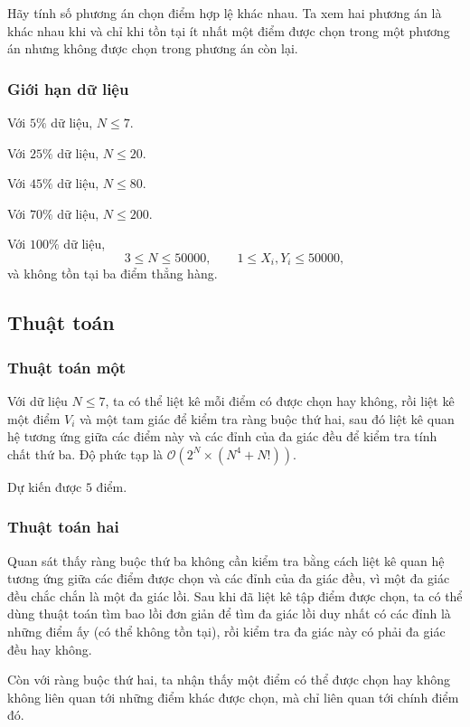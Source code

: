 \documentclass[11pt]{article}
\newcommand{\Oh}{\mathcal{O}}
\begin{document}
Hãy tính số phương án chọn điểm hợp lệ khác nhau. Ta xem hai phương án là khác
nhau khi và chỉ khi tồn tại ít nhất một điểm được chọn trong một phương án
nhưng không được chọn trong phương án còn lại.

\subsubsection{Giới hạn dữ liệu}

Với \(5\%\) dữ liệu, \(N\le 7\).

Với \(25\%\) dữ liệu, \(N\le 20\).

Với \(45\%\) dữ liệu, \(N\le 80\).

Với \(70\%\) dữ liệu, \(N\le 200\).

Với \(100\%\) dữ liệu,
\[
  3\le N\le 50000,\qquad 1\le X_i,Y_i\le 50000,
\]
và không tồn tại ba điểm thẳng hàng.

\subsection{Thuật toán}

\subsubsection{Thuật toán một}

Với dữ liệu \(N\le 7\), ta có thể liệt kê mỗi điểm có được chọn hay không, rồi
liệt kê một điểm \(V_i\) và một tam giác để kiểm tra ràng buộc thứ hai, sau đó
liệt kê quan hệ tương ứng giữa các điểm này và các đỉnh của đa giác đều để
kiểm tra tính chất thứ ba. Độ phức tạp là
\(\Oh(2^N\times (N^4+N!))\).

Dự kiến được \(5\) điểm.

\subsubsection{Thuật toán hai}

Quan sát thấy ràng buộc thứ ba không cần kiểm tra bằng cách liệt kê quan hệ
tương ứng giữa các điểm được chọn và các đỉnh của đa giác đều, vì một đa giác
đều chắc chắn là một đa giác lồi. Sau khi đã liệt kê tập điểm được chọn, ta có
thể dùng thuật toán tìm bao lồi đơn giản để tìm đa giác lồi duy nhất có các
đỉnh là những điểm ấy (có thể không tồn tại), rồi kiểm tra đa giác này có phải
đa giác đều hay không.

Còn với ràng buộc thứ hai, ta nhận thấy một điểm có thể được chọn hay không
không liên quan tới những điểm khác được chọn, mà chỉ liên quan tới chính điểm
đó.
\end{document}
